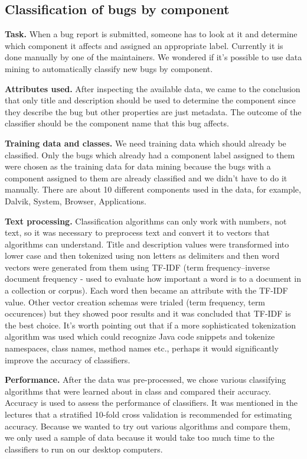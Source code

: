 \subsection{Classification of bugs by component} %
\label{sub:Classification of bugs bugs by component}

{\bf Task.} When a bug report is submitted, someone has to look at it and determine which component it affects and assigned an appropriate label. Currently it is done manually by one of the maintainers. We wondered if it's possible to use data mining to automatically classify new bugs by component.

{\bf Attributes used.} After inspecting the available data, we came to the conclusion that only title and description should be used to determine the component since they describe the bug but other properties are just metadata. The outcome of the classifier should be the component name that this bug affects.

{\bf Training data and classes.} We need training data which should already be classified. Only the bugs which already had a component label assigned to them were chosen as the training data for data mining because the bugs with a component assigned to them are already classified and we didn't have to do it manually. There are about 10 different components used in the data, for example, Dalvik, System, Browser, Applications.

{\bf Text processing.} Classification algorithms can only work with numbers, not text, so it was necessary to preprocess text and convert it to vectors that algorithms can understand. Title and description values were transformed into lower case and then tokenized using non letters as delimiters and then word vectors were generated from them using TF-IDF (term frequency–inverse document frequency - used to evaluate how important a word is to a document in a collection or corpus). Each word then became an attribute with the TF-IDF value. Other vector creation schemas were trialed (term frequency, term occurences) but they showed poor results and it was concluded that TF-IDF is the best choice. It's worth pointing out that if a more sophisticated tokenization algorithm was used which could recognize Java code snippets and tokenize namespaces, class names, method names etc., perhaps it would significantly improve the accuracy of classifiers.

{\bf Performance.} After the data was pre-processed, we chose various classifying algorithms that were learned about in class and compared their accuracy. Accuracy is used to assess the performance of classifiers. It was mentioned in the lectures that a stratified 10-fold cross validation is recommended for estimating accuracy. Because we wanted to try out various algorithms and compare them, we only used a sample of data because it would take too much time to the classifiers to run on our desktop computers.\newline

